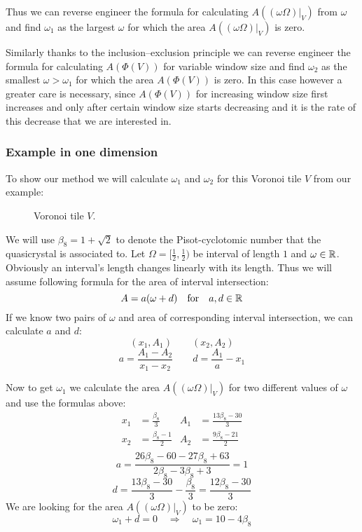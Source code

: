 \documentclass[text.tex]{subfiles}
\begin{document}
Thus we can reverse engineer the formula for calculating $A((\omega\Omega)|_V)$ from $\omega$ and find $\omega_1$ as the largest $\omega$ for which the area $A((\omega\Omega)|_V)$ is zero. 

Similarly thanks to the inclusion--exclusion principle we can reverse engineer the formula for calculating $A(\Phi(V))$ for variable window size and find $\omega_2$ as the smallest $\omega>\omega_1$ for which the area $A(\Phi(V))$ is zero. In this case however a greater care is necessary, since $A(\Phi(V))$ for increasing window size first increases and only after certain window size starts decreasing and it is the rate of this decrease that we are interested in. 

\subsubsection{Example in one dimension}
To show our method we will calculate $\omega_1$ and $\omega_2$ for this Voronoi tile $V$ from our example: 
\begin{figure}[h!]
\centering
\caption{Voronoi tile $V$.}
\label{fig_calculatingPeriodExample01}
\end{figure}

We will use $\beta_8 = 1+\sqrt{2}$ to denote the Pisot-cyclotomic number that the quasicrystal is associated to. 
Let $\Omega = [\frac{1}{2}, \frac{1}{2})$ be interval of length $1$ and $\omega\in\mathbb{R}$. Obviously an interval's length changes linearly with its length. Thus we will assume following formula for the area of interval intersection: 
$$A = a(\omega+d) \quad\text{for}\quad a,d\in\mathbb{R}$$
If we know two pairs of $\omega$ and area of corresponding interval intersection, we can calculate $a$ and $d$:
$$(x_1,A_1) \qquad (x_2,A_2)$$
$$a = \frac{A_1-A_2}{x_1-x_2} \qquad d=\frac{A_1}{a}-x_1$$

Now to get $\omega_1$ we calculate the area $A((\omega\Omega)|_V)$ for two different values of $\omega$ and use the formulas above: 
\begin{align*}
x_1&=\frac{\beta_8}{3} & A_1&=\frac{13\beta_8-30}{3} \\
x_2&=\frac{\beta_8-1}{2} & A_2&=\frac{9\beta_8-21}{2} \\
\end{align*}
$$a = \frac{26\beta_8-60-27\beta_8+63}{2\beta_8-3\beta_8+3} = 1$$
$$d = \frac{13\beta_8-30}{3}-\frac{\beta_8}{3} = \frac{12\beta_8-30}{3}$$
We are looking for the area $A((\omega\Omega)|_V)$ to be zero:
$$\omega_1+d=0\quad\Rightarrow\quad \omega_1 = 10-4\beta_8$$
\end{document}
